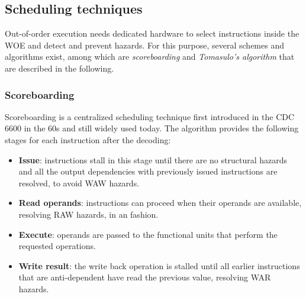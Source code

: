 \subsection{Scheduling techniques}
Out-of-order execution needs dedicated hardware to select instructions inside the \ac{WOE} and detect and prevent hazards. For this purpose, several schemes and algorithms exist, among which are \emph{scoreboarding} and \emph{Tomasulo's algorithm} that are described in the following.

\subsubsection{Scoreboarding}
Scoreboarding is a centralized scheduling technique first introduced in the CDC 6600 in the 60s \cite{scoreboard} and still widely used today. The algorithm provides the following stages for each instruction after the decoding:
\begin{itemize}
  \item \textbf{Issue}: instructions stall in this stage until there are no structural hazards and all the output dependencies with previously issued instructions are resolved, to avoid \ac{WAW} hazards.
  \item \textbf{Read operands}: instructions can proceed when their operands are available, resolving \ac{RAW} hazards, in an \ooo fashion.
  \item \textbf{Execute}: operands are passed to the functional units that perform the requested operations.
  \item \textbf{Write result}: the write back operation is stalled until all earlier instructions that are anti-dependent have read the previous value, resolving \ac{WAR} hazards. 
\end{itemize}

